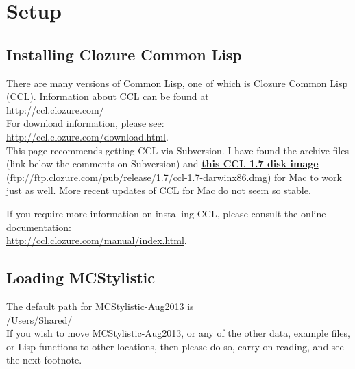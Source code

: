 \chapter{Setup}\label{chap:setup}

\section{Installing Clozure Common Lisp}\label{sec:installing-ccl}

There are many versions of Common Lisp, one of which is Clozure Common Lisp (CCL). Information about CCL can be found at\\[0.4cm] \href{http://ccl.clozure.com/}{http://ccl.clozure.com/}\\[0.4cm]%
For download information, please see:\\[0.4cm]
\href{http://ccl.clozure.com/download.html}{http://ccl.clozure.com/download.html}.\\[0.4cm]
This page recommends getting CCL via Subversion. I have found the archive files (link below the comments on Subversion) and \href{ftp://ftp.clozure.com/pub/release/1.7/ccl-1.7-darwinx86.dmg}{\textbf{this CCL 1.7 disk image}} (ftp://ftp.clozure.com/pub/release/1.7/ccl-1.7-darwinx86.dmg) for Mac to work just as well. More recent updates of CCL for Mac do not seem so stable.

If you require more information on installing CCL, please consult the online documentation:\\[0.4cm] \href{http://ccl.clozure.com/manual/index.html}{http://ccl.clozure.com/manual/index.html}.


\section{Loading MCStylistic}\label{sec:loading-MCStylistic}

The default path for MCStylistic-Aug2013 is
\\[0.4cm]
/Users/Shared/
\\[0.4cm]
If you wish to move MCStylistic-Aug2013, or any of the other data, example files, or Lisp functions to other locations, then please do so, carry on reading, and see the next footnote.

